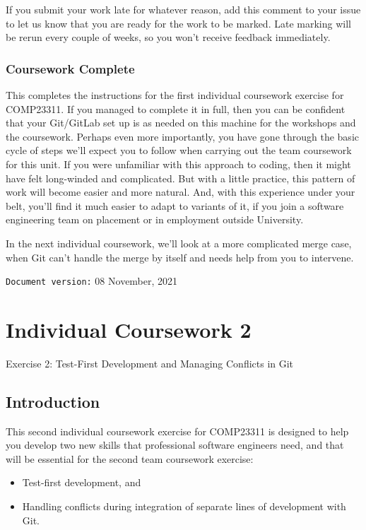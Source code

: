 \documentclass[
]{book}
\providecommand{\tightlist}{%
  \setlength{\itemsep}{0pt}\setlength{\parskip}{0pt}}
\begin{document}
If you submit your work late for whatever reason, add this comment to your issue to let us know that you are ready for the work to be marked. Late marking will be rerun every couple of weeks, so you won't receive feedback immediately.

\hypertarget{gameover}{%
\subsection{Coursework Complete}\label{gameover}}

This completes the instructions for the first individual coursework exercise for COMP23311. If you managed to complete it in full, then you can be confident that your Git/GitLab set up is as needed on this machine for the workshops and the coursework. Perhaps even more importantly, you have gone through the basic cycle of steps we'll expect you to follow when carrying out the team coursework for this unit. If you were unfamiliar with this approach to coding, then it might have felt long-winded and complicated. But with a little practice, this pattern of work will become easier and more natural. And, with this experience under your belt, you'll find it much easier to adapt to variants of it, if you join a software engineering team on placement or in employment outside University.

In the next individual coursework, we'll look at a more complicated merge case, when Git can't handle the merge by itself and needs help from you to intervene.

\texttt{Document\ version:} 08 November, 2021

\hypertarget{conflicting}{%
\chapter{Individual Coursework 2}\label{conflicting}}

Exercise 2: Test-First Development and Managing Conflicts in Git

\hypertarget{introt}{%
\section{Introduction}\label{introt}}

This second individual coursework exercise for COMP23311 is designed to help you develop two new skills that professional software engineers need, and that will be essential for the second team coursework exercise:

\begin{itemize}
\tightlist
\item
  Test-first development, and
\item
  Handling conflicts during integration of separate lines of development with Git.
\end{itemize}
\end{document}
